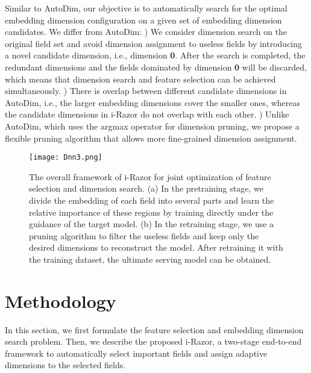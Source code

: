 \documentclass[10pt,journal,compsoc]{IEEEtran}
\begin{document}
Similar to AutoDim, our objective is to automatically search for the optimal embedding dimension configuration on a given set of embedding dimension candidates. We differ from AutoDim: ) We consider dimension search on the original field set and avoid dimension assignment to useless fields by introducing a novel candidate dimension, i.e., dimension \textbf{0}. 
After the search is completed, the redundant dimensions and the fields dominated by dimension \textbf{0} will be discarded, which means that dimension search and feature selection can be achieved simultaneously. 
) There is overlap between different candidate dimensions in AutoDim, i.e., the larger embedding dimensions cover the smaller ones, whereas the candidate dimensions in i-Razor do not overlap with each other. ) Unlike AutoDim, which uses the argmax operator for dimension pruning, we propose a flexible pruning algorithm that allows more fine-grained dimension assignment.


\begin{figure*}[t!]
  \centering
  \texttt{[image: Dnn3.png]}
  \caption{The overall framework of i-Razor for joint optimization of feature selection and dimension search.
  (a) In the pretraining stage, we divide the embedding of each field into several parts and learn the relative importance of these regions by training directly under the guidance of the target model. (b) In the retraining stage, we use a pruning algorithm to filter the useless fields and keep only the desired dimensions to reconstruct the model. After retraining it with the training dataset, the ultimate serving model can be obtained.}
  \label{fig:framework}
\end{figure*}

\section{Methodology}
\label{sec:method}
In this section, we first formulate the feature selection and embedding dimension search problem. %
Then, we describe the proposed i-Razor, a two-stage end-to-end framework to automatically select important fields and assign adaptive dimensions to the selected fields.
\end{document}
